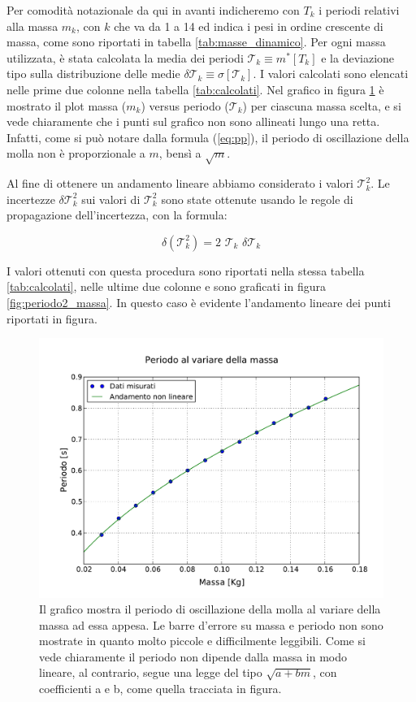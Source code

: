 Per comodità notazionale da qui in avanti indicheremo con $T_k$ i periodi relativi alla massa $m_k$, con $k$ che va da 1 a 14 ed
indica i pesi in ordine crescente di massa, come sono riportati in tabella \ref{tab:masse_dinamico}.
Per ogni massa utilizzata, è stata calcolata la media dei periodi $\mathcal{T}_k \equiv m^*[T_k]$ e la deviazione tipo sulla distribuzione
delle medie $\delta \mathcal{T}_k \equiv \sigma[\mathcal{T}_k]$. I valori calcolati sono elencati nelle prime
due colonne nella tabella \ref{tab:calcolati}.
Nel grafico in figura \ref{fig:periodo_massa} è mostrato il plot massa ($m_k$) versus periodo ($\mathcal{T}_k$)
per ciascuna massa scelta, e si vede chiaramente
che i punti sul grafico non sono allineati lungo una retta. Infatti, come si può notare dalla formula (\ref{eq:pp}),
il periodo di oscillazione della molla non è proporzionale a $m$, bensì a $\sqrt{m}$.

Al fine di ottenere un andamento lineare abbiamo considerato i valori $\mathcal{T}_k^2$. Le incertezze $\delta \mathcal{T}_k^2$
sui valori di $\mathcal{T}_k^2$ sono state ottenute usando le regole di propagazione dell'incertezza, con la formula:

\begin{equation*}
    \delta(\mathcal{T}_k^2) = 2 \,\, \mathcal{T}_k \,\, \delta \mathcal{T}_k
\end{equation*}

I valori ottenuti con questa procedura sono riportati nella stessa tabella \ref{tab:calcolati}, nelle ultime due colonne e sono
graficati in figura \ref{fig:periodo2_massa}. In questo caso è evidente l'andamento lineare dei punti riportati in figura.

\begin{figure}
    \centering
    \includegraphics[width=120mm]{immagini/periodo_massa.pdf}
    \caption{Il grafico mostra il periodo di oscillazione della molla al variare della massa ad essa appesa.
        Le barre d'errore su massa e periodo non sono mostrate in quanto molto piccole e difficilmente leggibili.
        Come si vede chiaramente il periodo non dipende dalla massa in modo lineare, al contrario, segue una legge del tipo
        $\sqrt{a + bm}$, con coefficienti a e b, come quella tracciata in figura.}
    \label{fig:periodo_massa}
\end{figure}

